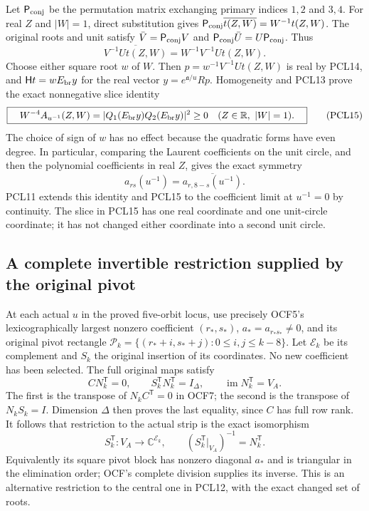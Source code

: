 Let $\mathsf P_{\rm conj}$ be the permutation matrix exchanging
primary indices $1,2$ and $3,4$. For real $Z$ and $|W|=1$, direct substitution
gives $\mathsf P_{\rm conj}\overline{t(Z,W)}=W^{-1}t(Z,W)$.
The original roots and unit satisfy
$\bar V=\mathsf P_{\rm conj}V$ and
$\mathsf P_{\rm conj}\bar U=U\mathsf P_{\rm conj}$. Thus
\[
 \overline{V^{-1}Ut(Z,W)}=W^{-1}V^{-1}Ut(Z,W).
 \tag{PCL14}
\]
Choose either square root $w$ of $W$. Then
$p=w^{-1}V^{-1}Ut(Z,W)$ is real by PCL14, and
$\mathsf Ht=wE_{\rm br}y$ for the real vector
$y=e^{\mathfrak a/u}Rp$. Homogeneity and PCL13 prove the exact
nonnegative slice identity
\[
 \boxed{\quad
 W^{-4}A_{u^{-1}}(Z,W)
   =|Q_1(E_{\rm br}y)Q_2(E_{\rm br}y)|^2\ge0
       \quad(Z\in\mathbb R,\ |W|=1).\quad}
 \tag{PCL15}
\]
The choice of sign of $w$ has no effect because the quadratic
forms have even degree. In particular, comparing the Laurent
coefficients on the unit circle, and then the polynomial
coefficients in real $Z$, gives the exact symmetry
\[
             a_{rs}(u^{-1})=\overline{a_{r,8-s}(u^{-1})}.
 \tag{PCL16}
\]
PCL11 extends this identity and PCL15 to the coefficient limit
at $u^{-1}=0$ by continuity. The slice in PCL15 has one real
coordinate and one unit-circle coordinate; it has not changed
either coordinate into a second unit circle.

\subsection{A complete invertible restriction supplied by the original pivot}
At each actual $u$ in the proved five-orbit locus, use precisely
OCF5's lexicographically largest nonzero coefficient $(r_*,s_*)$,
$a_*=a_{r_*s_*}\ne0$, and its original pivot rectangle
$\mathcal P_k=\{(r_*+i,s_*+j):0\le i,j\le k-8\}$.
Let $\mathcal E_k$ be its complement and $S_k$ the original
insertion of its coordinates. No new coefficient has been selected.
The full original maps satisfy
\[
 C N_k^{\mathsf T}=0,\qquad
 S_k^{\mathsf T}N_k^{\mathsf T}=I_\Delta,\qquad
 \operatorname{im}N_k^{\mathsf T}=V_A.
 \tag{PCL17}
\]
The first is the transpose of $N_kC^{\mathsf T}=0$ in OCF7;
the second is the transpose of $N_kS_k=I$. Dimension $\Delta$
then proves the last equality, since $C$ has full row rank.
It follows that restriction to the actual strip is the exact
isomorphism
\[
 S_k^{\mathsf T}:V_A\longrightarrow\mathbb C^{\mathcal E_k},
        \qquad (S_k^{\mathsf T}|_{V_A})^{-1}=N_k^{\mathsf T}.
 \tag{PCL18}
\]
Equivalently its square pivot block has nonzero diagonal $a_*$
and is triangular in the elimination order; OCF's complete
division supplies its inverse. This is an alternative restriction
to the central one in PCL12, with the exact changed set of roots.

